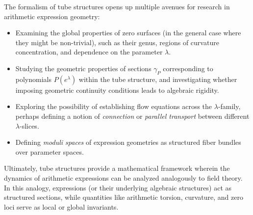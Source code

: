 The formalism of tube structures opens up multiple avenues for research in arithmetic expression geometry:

\begin{itemize}
    \item Examining the global properties of zero surfaces (in the general case where they might be non-trivial), such as their genus, regions of curvature concentration, and dependence on the parameter $\lambda$.
    \item Studying the geometric properties of sections $\gamma_P$ corresponding to polynomials $P(e^\lambda)$ within the tube structure, and investigating whether imposing geometric continuity conditions leads to algebraic rigidity.
    \item Exploring the possibility of establishing flow equations across the $\lambda$-family, perhaps defining a notion of \emph{connection} or \emph{parallel transport} between different $\lambda$-slices.
    \item Defining \emph{moduli spaces} of expression geometries as structured fiber bundles over parameter spaces.
\end{itemize}

Ultimately, tube structures provide a mathematical framework wherein the dynamics of arithmetic expressions can be analyzed analogously to field theory. In this analogy, expressions (or their underlying algebraic structures) act as structured sections, while quantities like arithmetic torsion, curvature, and zero loci serve as local or global invariants.